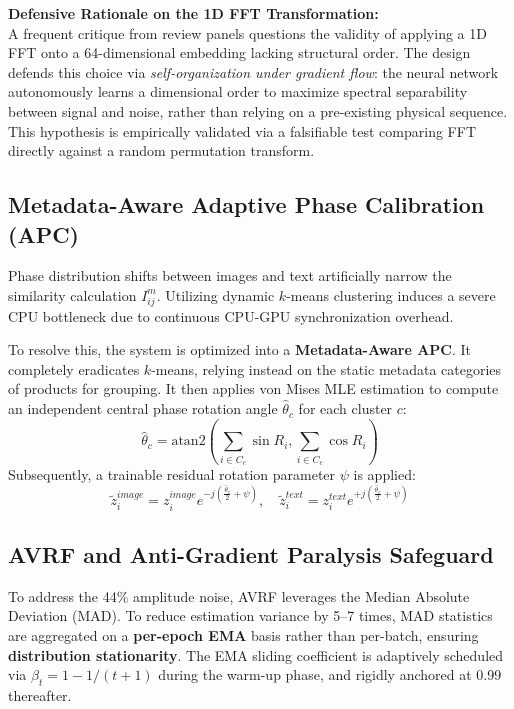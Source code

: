 \documentclass[12pt, a4paper]{article}
\begin{document}
\textbf{Defensive Rationale on the 1D FFT Transformation:}\\
A frequent critique from review panels questions the validity of applying a 1D FFT onto a 64-dimensional embedding lacking structural order. The design defends this choice via \textit{self-organization under gradient flow}: the neural network autonomously learns a dimensional order to maximize spectral separability between signal and noise, rather than relying on a pre-existing physical sequence. This hypothesis is empirically validated via a falsifiable test comparing FFT directly against a random permutation transform.

\subsection{Metadata-Aware Adaptive Phase Calibration (APC)}
Phase distribution shifts between images and text artificially narrow the similarity calculation $I_{ij}^{m}$. Utilizing dynamic $k$-means clustering induces a severe CPU bottleneck due to continuous CPU-GPU synchronization overhead.

To resolve this, the system is optimized into a \textbf{Metadata-Aware APC}. It completely eradicates $k$-means, relying instead on the static metadata categories of products for grouping. It then applies von Mises MLE estimation to compute an independent central phase rotation angle $\hat{\theta}_c$ for each cluster $c$:
\begin{equation}
\hat{\theta}_c = \text{atan2}\left(\sum_{i \in C_c} \sin R_i, \sum_{i \in C_c} \cos R_i\right)
\end{equation}
Subsequently, a trainable residual rotation parameter $\psi$ is applied:
\begin{equation}
\tilde{z}_i^{image} = z_i^{image}e^{-j(\frac{\hat{\theta}_c}{2} + \psi)}, \quad \tilde{z}_i^{text} = z_i^{text}e^{+j(\frac{\hat{\theta}_c}{2} + \psi)}
\end{equation}

\subsection{AVRF and Anti-Gradient Paralysis Safeguard}
To address the 44\% amplitude noise, AVRF leverages the Median Absolute Deviation (MAD). To reduce estimation variance by 5--7 times, MAD statistics are aggregated on a \textbf{per-epoch EMA} basis rather than per-batch, ensuring \textbf{distribution stationarity}. The EMA sliding coefficient is adaptively scheduled via $\beta_t = 1 - 1/(t+1)$ during the warm-up phase, and rigidly anchored at 0.99 thereafter.
\end{document}

